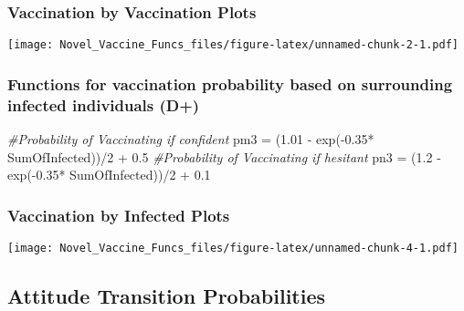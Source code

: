 \documentclass[
]{article}
\newenvironment{Shaded}{\begin{snugshade}}{\end{snugshade}}
\newcommand{\CommentTok}[1]{\textcolor[rgb]{0.56,0.35,0.01}{\textit{#1}}}
\newcommand{\DecValTok}[1]{\textcolor[rgb]{0.00,0.00,0.81}{#1}}
\newcommand{\FloatTok}[1]{\textcolor[rgb]{0.00,0.00,0.81}{#1}}
\newcommand{\FunctionTok}[1]{\textcolor[rgb]{0.00,0.00,0.00}{#1}}
\newcommand{\NormalTok}[1]{#1}
\newcommand{\OtherTok}[1]{\textcolor[rgb]{0.56,0.35,0.01}{#1}}
\newcommand{\SpecialCharTok}[1]{\textcolor[rgb]{0.00,0.00,0.00}{#1}}
\begin{document}
\hypertarget{vaccination-by-vaccination-plots}{%
\subsubsection{Vaccination by Vaccination
Plots}\label{vaccination-by-vaccination-plots}}

\texttt{[image: Novel\_Vaccine\_Funcs\_files/figure-latex/unnamed-chunk-2-1.pdf]}

\hypertarget{functions-for-vaccination-probability-based-on-surrounding-infected-individuals-d}{%
\subsubsection{Functions for vaccination probability based on
surrounding infected individuals
(D+)}\label{functions-for-vaccination-probability-based-on-surrounding-infected-individuals-d}}

\begin{Shaded}
\begin{Highlighting}[]
\CommentTok{\#Probability of Vaccinating if confident}
\NormalTok{pm3 }\OtherTok{=}\NormalTok{  (}\FloatTok{1.01} \SpecialCharTok{{-}} \FunctionTok{exp}\NormalTok{(}\SpecialCharTok{{-}}\FloatTok{0.35}\SpecialCharTok{*}\NormalTok{ SumOfInfected))}\SpecialCharTok{/}\DecValTok{2} \SpecialCharTok{+} \FloatTok{0.5}
\CommentTok{\#Probability of Vaccinating if hesitant}
\NormalTok{pn3 }\OtherTok{=}\NormalTok{ (}\FloatTok{1.2} \SpecialCharTok{{-}} \FunctionTok{exp}\NormalTok{(}\SpecialCharTok{{-}}\FloatTok{0.35}\SpecialCharTok{*}\NormalTok{ SumOfInfected))}\SpecialCharTok{/}\DecValTok{2} \SpecialCharTok{+} \FloatTok{0.1}
\end{Highlighting}
\end{Shaded}

\hypertarget{vaccination-by-infected-plots}{%
\subsubsection{Vaccination by Infected
Plots}\label{vaccination-by-infected-plots}}

\texttt{[image: Novel\_Vaccine\_Funcs\_files/figure-latex/unnamed-chunk-4-1.pdf]}

\hypertarget{attitude-transition-probabilities}{%
\subsection{Attitude Transition
Probabilities}\label{attitude-transition-probabilities}}
\end{document}
